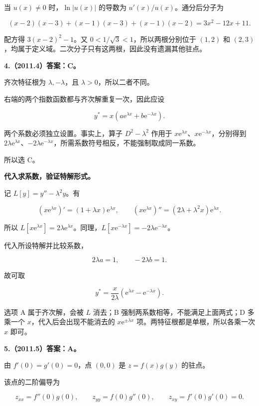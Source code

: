 \documentclass[UTF8,11pt,fontset=windows]{ctexart}
\begin{document}
当 $u(x)\ne0$ 时，$\ln|u(x)|$ 的导数为 $u'(x)/u(x)$。通分后分子为

$$
(x-2)(x-3)+(x-1)(x-3)+(x-1)(x-2)
=3x^2-12x+11.
$$

配方得 $3(x-2)^2-1$。又 $0<1/\sqrt3<1$，所以两根分别位于 $(1,2)$ 和 $(2,3)$，均属于定义域。二次分子只有这两根，因此没有遗漏其他驻点。

\clearpage

\textbf{4.（2011.4）答案：C。}

齐次特征根为 $\lambda,-\lambda$，且 $\lambda>0$，所以二者不同。

右端的两个指数函数都与齐次解重复一次，因此应设

$$
y^*=x(a\mathrm e^{\lambda x}+b\mathrm e^{-\lambda x}).
$$

两个系数必须独立设置。事实上，算子 $D^2-\lambda^2$ 作用于 $x\mathrm e^{\lambda x}$、$x\mathrm e^{-\lambda x}$，分别得到 $2\lambda\mathrm e^{\lambda x}$、$-2\lambda\mathrm e^{-\lambda x}$，所需系数符号相反，不能强制取成同一系数。

所以选 C。

\textbf{代入求系数，验证特解形式。}

记 $L[y]=y''-\lambda^2y$。有

$$
(x\mathrm e^{\lambda x})'=(1+\lambda x)\mathrm e^{\lambda x},
\qquad
(x\mathrm e^{\lambda x})''=(2\lambda+\lambda^2x)\mathrm e^{\lambda x}.
$$

所以 $L[x\mathrm e^{\lambda x}]=2\lambda\mathrm e^{\lambda x}$。同理，$L[x\mathrm e^{-\lambda x}]=-2\lambda\mathrm e^{-\lambda x}$。

代入所设特解并比较系数，

$$
2\lambda a=1,\qquad-2\lambda b=1.
$$

故可取

$$
y^*=\frac{x}{2\lambda}(\mathrm e^{\lambda x}-\mathrm e^{-\lambda x}).
$$

选项 A 属于齐次解，会被 $L$ 消去；B 强制两系数相等，不能满足上面两式；D 多乘一个 $x$，代入后会出现不能消去的 $x\mathrm e^{\pm\lambda x}$ 项。两特征根都是单根，所以各乘一次 $x$ 即可。

\clearpage

\textbf{5.（2011.5）答案：A。}

由 $f'(0)=g'(0)=0$，点 $(0,0)$ 是 $z=f(x)g(y)$ 的驻点。

该点的二阶偏导为

$$
z_{xx}=f''(0)g(0),\qquad
z_{yy}=f(0)g''(0),\qquad
z_{xy}=f'(0)g'(0)=0.
$$
\end{document}
